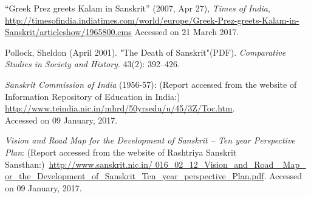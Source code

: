 \begin{thebibliography}{99}
\itemsep=2pt
“Greek Prez greets Kalam in Sanskrit” (2007, Apr 27), {\sl Times of India}, \url{http://timesofindia.indiatimes.com/world/europe/Greek-Prez-greets-Kalam-in-Sanskrit/articleshow/1965800.cms}  Accessed on 21 March 2017. 

Pollock, Sheldon (April 2001). "The Death of Sanskrit"(PDF). {\sl Comparative Studies in Society and History}. 43(2): 392--426.

{\sl Sanskrit Commission of India} (1956-57): (Report accessed from the website of Information Repository of Education in India:) \url{http://www.teindia.nic.in/mhrd/50yrsedu/u/45/3Z/Toc.htm}.\\ Accessed on 09 January, 2017.

{\sl Vision and Road Map for the Development of Sanskrit – Ten year Perspective Plan}: (Report accessed from the website 
of Rashtriya Sanskrit Sansthan:)~\url{http://www.sanskrit.nic.in/ 016_02_12_Vision_and_Road_ Map_ or_the_Development_of_Sanskrit_Ten_year_perspective_Plan.pdf}. Accessed on 09 January, 2017.
\end{thebibliography}
